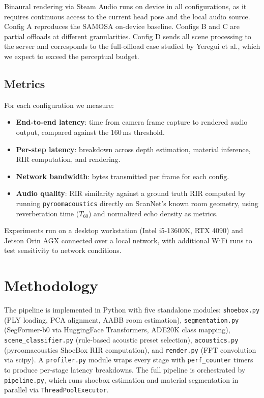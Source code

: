 \documentclass[11pt]{article}
\begin{document}
Binaural rendering via Steam Audio runs on device in all configurations, as
it requires continuous access to the current head pose and the local audio
source. Config A reproduces the SAMOSA on-device baseline. Configs B and C
are partial offloads at different granularities. Config D sends all scene
processing to the server and corresponds to the full-offload case studied
by Yeregui et al., which we expect to exceed the perceptual budget.

\subsection{Metrics}

For each configuration we measure:

\begin{itemize}[noitemsep]
  \item \textbf{End-to-end latency}: time from camera frame capture to
        rendered audio output, compared against the 160\,ms threshold.
  \item \textbf{Per-step latency}: breakdown across depth estimation,
        material inference, RIR computation, and rendering.
  \item \textbf{Network bandwidth}: bytes transmitted per frame for each config.
  \item \textbf{Audio quality}: RIR similarity against a ground truth RIR
        computed by running \texttt{pyroomacoustics} directly on ScanNet's
        known room geometry, using reverberation time ($T_{60}$) and
        normalized echo density as metrics.
\end{itemize}

Experiments run on a desktop workstation (Intel i5-13600K, RTX 4090) and
Jetson Orin AGX connected over a local network, with additional WiFi runs
to test sensitivity to network conditions.

\section{Methodology}

The pipeline is implemented in Python with five standalone modules:
\texttt{shoebox.py} (PLY loading, PCA alignment, AABB room estimation),
\texttt{segmentation.py} (SegFormer-b0 via HuggingFace Transformers, ADE20K class mapping),
\texttt{scene\_classifier.py} (rule-based acoustic preset selection),
\texttt{acoustics.py} (pyroomacoustics ShoeBox RIR computation), and
\texttt{render.py} (FFT convolution via scipy). A \texttt{profiler.py} module
wraps every stage with \texttt{perf\_counter} timers to produce per-stage latency
breakdowns. The full pipeline is orchestrated by \texttt{pipeline.py}, which runs
shoebox estimation and material segmentation in parallel via \texttt{ThreadPoolExecutor}.
\end{document}
